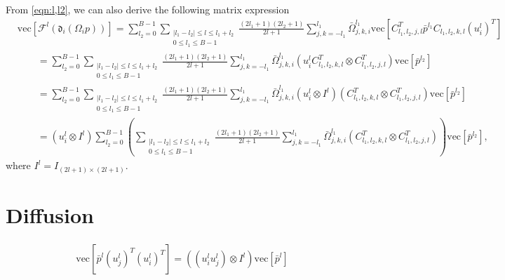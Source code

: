 \documentclass[12pt]{article}
\newcommand{\abs}[1]{\ensuremath{\left| #1 \right|}}
\newcommand{\vect}[1]{\ensuremath{\mathrm{vec}\left[ #1 \right]}}
\newcommand{\liediff}{\mathfrak{d}}
\begin{document}
From \eqref{eqn:l,l2}, we can also derive the following matrix expression
\begin{align*}
	&\vect{\mathcal{F}^l(\liediff_i(\Omega_ip))} = \sum_{l_2=0}^{B-1} \sum_{\substack{\abs{l_1-l_2} \leq l \leq l_1+l_2 \\ 0 \leq l_1 \leq B-1}} \frac{(2l_1+1)(2l_2+1)}{2l+1} \sum_{j,k=-l_1}^{l_1} \bar{\Omega}_{j,k,i}^{l_1} \vect{C_{l_1,l_2,j,l}^T \bar{p}^{l_1} C_{l_1,l_2,k,l}(u_i^l)^T} \\
	&\qquad = \sum_{l_2=0}^{B-1} \sum_{\substack{\abs{l_1-l_2} \leq l \leq l_1+l_2 \\ 0 \leq l_1 \leq B-1}} \frac{(2l_1+1)(2l_2+1)}{2l+1} \sum_{j,k=-l_1}^{l_1} \bar{\Omega}_{j,k,i}^{l_1} (u_i^l C_{l_1,l_2,k,l}^T \otimes C_{l_1,l_2,j,l}^T) \vect{\bar{p}^{l_2}} \\
	&\qquad = \sum_{l_2=0}^{B-1} \sum_{\substack{\abs{l_1-l_2} \leq l \leq l_1+l_2 \\ 0 \leq l_1 \leq B-1}} \frac{(2l_1+1)(2l_2+1)}{2l+1} \sum_{j,k=-l_1}^{l_1} \bar{\Omega}_{j,k,i}^{l_1} (u_i^l \otimes I^l)(C_{l_1,l_2,k,l}^T \otimes C_{l_1,l_2,j,l}^T) \vect{\bar{p}^{l_2}} \\
	&\qquad = (u_i^l \otimes I^l) \sum_{l_2=0}^{B-1} \left( \sum_{\substack{\abs{l_1-l_2} \leq l \leq l_1+l_2 \\ 0 \leq l_1 \leq B-1}} \frac{(2l_1+1)(2l_2+1)}{2l+1} \sum_{j,k=-l_1}^{l_1} \bar{\Omega}_{j,k,i}^{l_1} (C_{l_1,l_2,k,l}^T \otimes C_{l_1,l_2,j,l}^T) \right) \vect{\bar{p}^{l_2}},
\end{align*}
where $I^l = I_{(2l+1) \times (2l+1)}$.

\section{Diffusion}

\begin{align*}
	\vect{\bar{p}^l(u_j^l)^T(u_i^l)^T} = \left( (u_i^lu_j^l) \otimes I^l \right) \vect{\bar{p}^l}
\end{align*}
\end{document}
